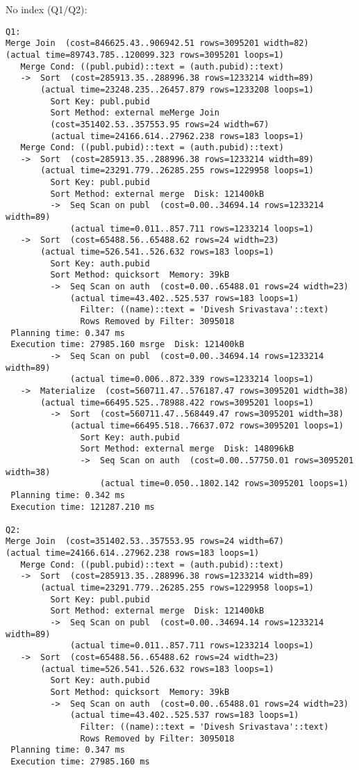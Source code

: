 \documentclass[11pt]{scrartcl}
\begin{document}
\noindent No index (Q1/Q2):
{\small
\begin{verbatim}
Q1:
Merge Join  (cost=846625.43..906942.51 rows=3095201 width=82)
(actual time=89743.785..120099.323 rows=3095201 loops=1)
   Merge Cond: ((publ.pubid)::text = (auth.pubid)::text)
   ->  Sort  (cost=285913.35..288996.38 rows=1233214 width=89)
       (actual time=23248.235..26457.879 rows=1233208 loops=1)
         Sort Key: publ.pubid
         Sort Method: external meMerge Join
         (cost=351402.53..357553.95 rows=24 width=67)
         (actual time=24166.614..27962.238 rows=183 loops=1)
   Merge Cond: ((publ.pubid)::text = (auth.pubid)::text)
   ->  Sort  (cost=285913.35..288996.38 rows=1233214 width=89)
       (actual time=23291.779..26285.255 rows=1229958 loops=1)
         Sort Key: publ.pubid
         Sort Method: external merge  Disk: 121400kB
         ->  Seq Scan on publ  (cost=0.00..34694.14 rows=1233214 width=89)
             (actual time=0.011..857.711 rows=1233214 loops=1)
   ->  Sort  (cost=65488.56..65488.62 rows=24 width=23)
       (actual time=526.541..526.632 rows=183 loops=1)
         Sort Key: auth.pubid
         Sort Method: quicksort  Memory: 39kB
         ->  Seq Scan on auth  (cost=0.00..65488.01 rows=24 width=23)
             (actual time=43.402..525.537 rows=183 loops=1)
               Filter: ((name)::text = 'Divesh Srivastava'::text)
               Rows Removed by Filter: 3095018
 Planning time: 0.347 ms
 Execution time: 27985.160 msrge  Disk: 121400kB
         ->  Seq Scan on publ  (cost=0.00..34694.14 rows=1233214 width=89)
             (actual time=0.006..872.339 rows=1233214 loops=1)
   ->  Materialize  (cost=560711.47..576187.47 rows=3095201 width=38)
       (actual time=66495.525..78988.422 rows=3095201 loops=1)
         ->  Sort  (cost=560711.47..568449.47 rows=3095201 width=38)
             (actual time=66495.518..76637.072 rows=3095201 loops=1)
               Sort Key: auth.pubid
               Sort Method: external merge  Disk: 148096kB
               ->  Seq Scan on auth  (cost=0.00..57750.01 rows=3095201 width=38)
                   (actual time=0.050..1802.142 rows=3095201 loops=1)
 Planning time: 0.342 ms
 Execution time: 121287.210 ms

Q2:
Merge Join  (cost=351402.53..357553.95 rows=24 width=67)
(actual time=24166.614..27962.238 rows=183 loops=1)
   Merge Cond: ((publ.pubid)::text = (auth.pubid)::text)
   ->  Sort  (cost=285913.35..288996.38 rows=1233214 width=89)
       (actual time=23291.779..26285.255 rows=1229958 loops=1)
         Sort Key: publ.pubid
         Sort Method: external merge  Disk: 121400kB
         ->  Seq Scan on publ  (cost=0.00..34694.14 rows=1233214 width=89)
             (actual time=0.011..857.711 rows=1233214 loops=1)
   ->  Sort  (cost=65488.56..65488.62 rows=24 width=23)
       (actual time=526.541..526.632 rows=183 loops=1)
         Sort Key: auth.pubid
         Sort Method: quicksort  Memory: 39kB
         ->  Seq Scan on auth  (cost=0.00..65488.01 rows=24 width=23)
             (actual time=43.402..525.537 rows=183 loops=1)
               Filter: ((name)::text = 'Divesh Srivastava'::text)
               Rows Removed by Filter: 3095018
 Planning time: 0.347 ms
 Execution time: 27985.160 ms
\end{verbatim}
}
\end{document}
